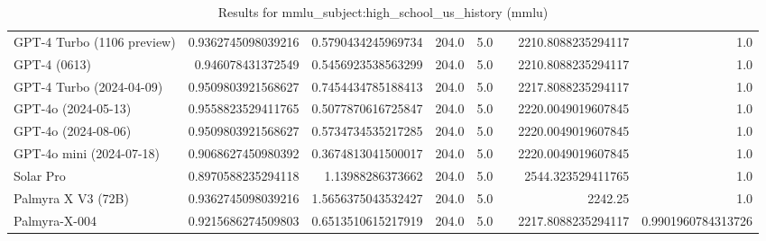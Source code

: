 \begin{table}[htp]
{\begin{tabular}{lrrrrrrr}
GPT-4 Turbo (1106 preview) & 0.9362745098039216 & 0.5790434245969734 & 204.0 & 5.0 &  & 2210.8088235294117 & 1.0 \\
GPT-4 (0613) & 0.946078431372549 & 0.5456923538563299 & 204.0 & 5.0 &  & 2210.8088235294117 & 1.0 \\
GPT-4 Turbo (2024-04-09) & 0.9509803921568627 & 0.7454434785188413 & 204.0 & 5.0 &  & 2217.8088235294117 & 1.0 \\
GPT-4o (2024-05-13) & 0.9558823529411765 & 0.5077870616725847 & 204.0 & 5.0 &  & 2220.0049019607845 & 1.0 \\
GPT-4o (2024-08-06) & 0.9509803921568627 & 0.5734734535217285 & 204.0 & 5.0 &  & 2220.0049019607845 & 1.0 \\
GPT-4o mini (2024-07-18) & 0.9068627450980392 & 0.3674813041500017 & 204.0 & 5.0 &  & 2220.0049019607845 & 1.0 \\
Solar Pro & 0.8970588235294118 & 1.13988286373662 & 204.0 & 5.0 &  & 2544.323529411765 & 1.0 \\
Palmyra X V3 (72B) & 0.9362745098039216 & 1.5656375043532427 & 204.0 & 5.0 &  & 2242.25 & 1.0 \\
Palmyra-X-004 & 0.9215686274509803 & 0.6513510615217919 & 204.0 & 5.0 &  & 2217.8088235294117 & 0.9901960784313726 \\
\bottomrule
\end{tabular}}
\caption{Results for mmlu_subject:high_school_us_history (mmlu)}
\label{fig:mmlu_subject:high_school_us_history (mmlu)}
\end{table}